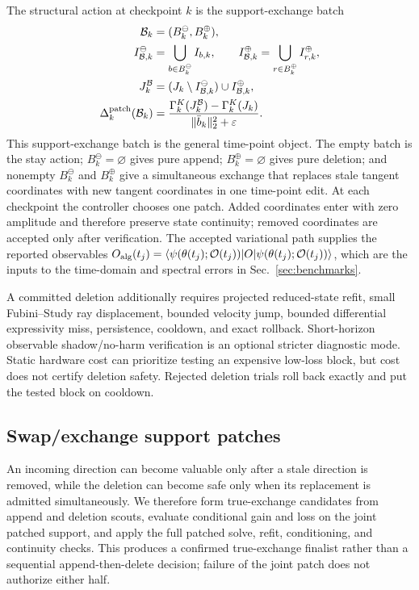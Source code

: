 \documentclass[
  reprint,
  amsmath,
  amssymb,
  aps,
  pra,
  nofootinbib,
  superscriptaddress,
  floatfix
]{revtex4-2}
\newcommand{\Oset}{\mathcal{O}}
\newcommand{\eps}{\varepsilon}
\newcommand{\ket}[1]{|#1\rangle}
\newcommand{\bra}[1]{\langle #1|}
\begin{document}
The structural action at checkpoint $k$ is the support-exchange batch
\begin{equation}
\begin{aligned}
\mathcal B_k&=(B_k^{\ominus},B_k^{\oplus}),\\
I_{\mathcal B,k}^{\ominus}
&=\bigcup_{b\in B_k^{\ominus}}I_{b,k},
\qquad
I_{\mathcal B,k}^{\oplus}
=\bigcup_{r\in B_k^{\oplus}}I_{r,k}^{\oplus},\\
J_k^{\mathcal B}
&=(J_k\setminus I_{\mathcal B,k}^{\ominus})\cup I_{\mathcal B,k}^{\oplus},\\
\Delta_k^{\rm patch}(\mathcal B_k)
&=
\frac{\Gamma_k^K(J_k^{\mathcal B})-\Gamma_k^K(J_k)}
{\|\bar b_k\|_2^2+\eps}.
\end{aligned}
\label{eq:structural_patch}
\end{equation}
This support-exchange batch is the general time-point object.  The empty batch is the stay action; \(B_k^{\ominus}=\varnothing\) gives pure append; \(B_k^{\oplus}=\varnothing\) gives pure deletion; and nonempty \(B_k^{\ominus}\) and \(B_k^{\oplus}\) give a simultaneous exchange that replaces stale tangent coordinates with new tangent coordinates in one time-point edit.  At each checkpoint the controller chooses one patch. Added coordinates enter with zero amplitude and therefore preserve state continuity; removed coordinates are accepted only after verification. The accepted variational path supplies the reported observables $O_{\rm alg}(t_j)=\bra{\psi(\theta(t_j);\Oset(t_j))}O\ket{\psi(\theta(t_j);\Oset(t_j))}$, which are the inputs to the time-domain and spectral errors in Sec.~\ref{sec:benchmarks}.

A committed deletion additionally requires projected reduced-state refit, small Fubini--Study ray displacement, bounded velocity jump, bounded differential expressivity miss, persistence, cooldown, and exact rollback. Short-horizon observable shadow/no-harm verification is an optional stricter diagnostic mode. Static hardware cost can prioritize testing an expensive low-loss block, but cost does not certify deletion safety. Rejected deletion trials roll back exactly and put the tested block on cooldown.

\subsection{Swap/exchange support patches}

An incoming direction can become valuable only after a stale direction is removed, while the deletion can become safe only when its replacement is admitted simultaneously.  We therefore form true-exchange candidates from append and deletion scouts, evaluate conditional gain and loss on the joint patched support, and apply the full patched solve, refit, conditioning, and continuity checks.  This produces a confirmed true-exchange finalist rather than a sequential append-then-delete decision; failure of the joint patch does not authorize either half.
\end{document}
